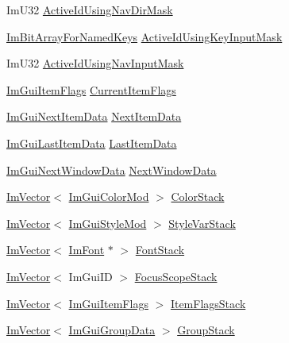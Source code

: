\begin{DoxyCompactItemize}
\item 
Im\+U32 \hyperlink{structImGuiContext_a6b69393a8ff5153f6c5adac6eff7f130}{Active\+Id\+Using\+Nav\+Dir\+Mask}
\item 
\hyperlink{imgui__internal_8h_a35d93a6af4467a5b0762da6bd3bd1bd6}{Im\+Bit\+Array\+For\+Named\+Keys} \hyperlink{structImGuiContext_ad1d1dc1f7d29ce091b12d3d37b3ccdb0}{Active\+Id\+Using\+Key\+Input\+Mask}
\item 
Im\+U32 \hyperlink{structImGuiContext_ac5c2b9d6a845be44a96d22ca24d4ffc3}{Active\+Id\+Using\+Nav\+Input\+Mask}
\item 
\hyperlink{imgui__internal_8h_abcf9eafab4557e911b2c0d8fe2feeb38}{Im\+Gui\+Item\+Flags} \hyperlink{structImGuiContext_a2b9e83b70baf004df8bd1ccf2a640ed4}{Current\+Item\+Flags}
\item 
\hyperlink{structImGuiNextItemData}{Im\+Gui\+Next\+Item\+Data} \hyperlink{structImGuiContext_a3c05fda47e3d35e3279387a2524ac6cb}{Next\+Item\+Data}
\item 
\hyperlink{structImGuiLastItemData}{Im\+Gui\+Last\+Item\+Data} \hyperlink{structImGuiContext_a47a03a88886e1700f40be15d9fd9329e}{Last\+Item\+Data}
\item 
\hyperlink{structImGuiNextWindowData}{Im\+Gui\+Next\+Window\+Data} \hyperlink{structImGuiContext_a1220ef65a7464ef2dc4a6020cd1b9c47}{Next\+Window\+Data}
\item 
\hyperlink{structImVector}{Im\+Vector}$<$ \hyperlink{structImGuiColorMod}{Im\+Gui\+Color\+Mod} $>$ \hyperlink{structImGuiContext_ae3c32dfddf77ff73f122b8ed644176ca}{Color\+Stack}
\item 
\hyperlink{structImVector}{Im\+Vector}$<$ \hyperlink{structImGuiStyleMod}{Im\+Gui\+Style\+Mod} $>$ \hyperlink{structImGuiContext_abc0ca120e14467083bee0400d9abbabe}{Style\+Var\+Stack}
\item 
\hyperlink{structImVector}{Im\+Vector}$<$ \hyperlink{structImFont}{Im\+Font} $\ast$ $>$ \hyperlink{structImGuiContext_a8a6a9f23604fe0d0b51c78e45e4432b0}{Font\+Stack}
\item 
\hyperlink{structImVector}{Im\+Vector}$<$ Im\+Gui\+ID $>$ \hyperlink{structImGuiContext_a56ca0a9debefb6f4e96b03602b8cb551}{Focus\+Scope\+Stack}
\item 
\hyperlink{structImVector}{Im\+Vector}$<$ \hyperlink{imgui__internal_8h_abcf9eafab4557e911b2c0d8fe2feeb38}{Im\+Gui\+Item\+Flags} $>$ \hyperlink{structImGuiContext_a85e81a50ff68aaf925faab072b710edd}{Item\+Flags\+Stack}
\item 
\hyperlink{structImVector}{Im\+Vector}$<$ \hyperlink{structImGuiGroupData}{Im\+Gui\+Group\+Data} $>$ \hyperlink{structImGuiContext_a77874099397573e207c03405508e3637}{Group\+Stack}

\end{DoxyCompactItemize}
